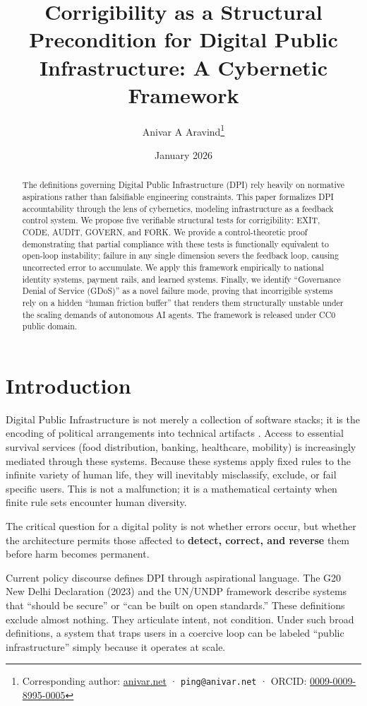 \documentclass{article}
\title{Corrigibility as a Structural Precondition for Digital Public Infrastructure: A Cybernetic Framework}
\author[1]{Anivar A Aravind\thanks{Corresponding author: \href{https://anivar.net}{anivar.net} · \texttt{ping@anivar.net} · ORCID: \href{https://orcid.org/0009-0009-8995-0005}{0009-0009-8995-0005}}}
\affil[1]{Independent Researcher}
\date{January 2026}
\begin{document}
\maketitle

\begin{abstract}
The definitions governing Digital Public Infrastructure (DPI) rely heavily on normative aspirations rather than falsifiable engineering constraints. This paper formalizes DPI accountability through the lens of cybernetics, modeling infrastructure as a feedback control system. We propose five verifiable structural tests for corrigibility: EXIT, CODE, AUDIT, GOVERN, and FORK. We provide a control-theoretic proof demonstrating that partial compliance with these tests is functionally equivalent to open-loop instability; failure in any single dimension severs the feedback loop, causing uncorrected error to accumulate. We apply this framework empirically to national identity systems, payment rails, and learned systems. Finally, we identify ``Governance Denial of Service (GDoS)'' as a novel failure mode, proving that incorrigible systems rely on a hidden ``human friction buffer'' that renders them structurally unstable under the scaling demands of autonomous AI agents. The framework is released under CC0 public domain.
\end{abstract}

\section{Introduction}

Digital Public Infrastructure is not merely a collection of software stacks; it is the encoding of political arrangements into technical artifacts \citep{winner1980}. Access to essential survival services (food distribution, banking, healthcare, mobility) is increasingly mediated through these systems. Because these systems apply fixed rules to the infinite variety of human life, they will inevitably misclassify, exclude, or fail specific users. This is not a malfunction; it is a mathematical certainty when finite rule sets encounter human diversity.

The critical question for a digital polity is not whether errors occur, but whether the architecture permits those affected to \textbf{detect, correct, and reverse} them before harm becomes permanent.

Current policy discourse defines DPI through aspirational language. The G20 New Delhi Declaration (2023) and the UN/UNDP framework \citep{undp} describe systems that ``should be secure'' or ``can be built on open standards.'' These definitions exclude almost nothing. They articulate intent, not condition. Under such broad definitions, a system that traps users in a coercive loop can be labeled ``public infrastructure'' simply because it operates at scale.
\end{document}
